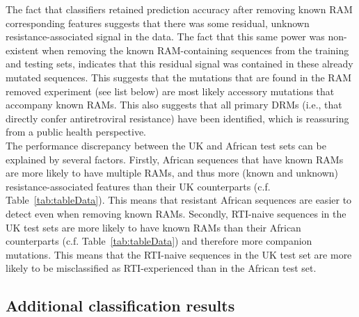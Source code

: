 \documentclass[
  11pt,
  twoside]{scrbook}
\begin{document}
The fact that classifiers retained prediction accuracy after removing
known RAM corresponding features suggests that there was some residual,
unknown resistance-associated signal in the data. The fact that this
same power was non-existent when removing the known RAM-containing
sequences from the training and testing sets, indicates that this
residual signal was contained in these already mutated sequences. This
suggests that the mutations that are found in the RAM removed experiment
(see list below) are most likely accessory mutations that accompany
known RAMs. This also suggests that all primary DRMs (i.e., that
directly confer antiretroviral resistance) have been identified, which
is reassuring from a public health perspective.\\
The performance discrepancy between the UK and African test sets can be
explained by several factors. Firstly, African sequences that have known
RAMs are more likely to have multiple RAMs, and thus more (known and
unknown) resistance-associated features than their UK counterparts (c.f.
Table~\ref{tab:tableData}). This
means that resistant African sequences are easier to detect even when
removing known RAMs. Secondly, RTI-naive sequences in the UK test sets
are more likely to have known RAMs than their African counterparts (c.f.
Table~\ref{tab:tableData}) and
therefore more companion mutations. This means that the RTI-naive
sequences in the UK test set are more likely to be misclassified as
RTI-experienced than in the African test set.

\hypertarget{additional-classification-results}{%
\subsection{Additional classification results}\label{additional-classification-results}}
\end{document}
